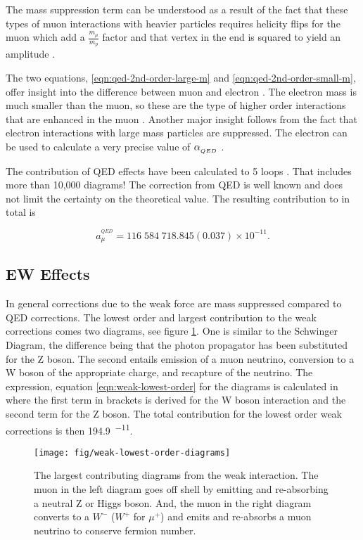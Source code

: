 \noindent
The mass suppression term can be understood as a result of the fact that these types of muon interactions with heavier particles requires helicity flips for the muon which add a $\frac{m_\mu}{m_p}$ factor and that vertex in the end is squared to yield an amplitude \cite{amm-of-muon}.

The two equations, \ref{eqn:qed-2nd-order-large-m} and \ref{eqn:qed-2nd-order-small-m}, offer insight into the difference between muon and electron \gmtwo.  The electron mass is much smaller than the muon, so these are the type of higher order interactions that are enhanced in the muon \gmtwo.  Another major insight follows from the fact that electron interactions with large mass particles are suppressed.  The electron \gmtwo can be used to calculate a very precise value of $\alpha_{_{QED}}$ \cite{g-e-measurement}.

The contribution of QED effects have been calculated to 5 loops \cite{5-loop-qed}.  That includes more than 10,000 diagrams!  The correction from QED is well known and does not limit the certainty on the theoretical value.  The resulting contribution to \mugmtwo in total is

\begin{equation}
\label{eqn:qed-total}
a_\mu^{^{QED}} = 116\;584\;718.845(0.037) \times 10^{-11}.
\end{equation}

\subsection{EW Effects} \label{s-sec:theory-ew}

In general corrections due to the weak force are mass suppressed compared to QED corrections.  The lowest order and largest contribution to the weak corrections comes two diagrams, see figure \ref{fig:weak-lowest-order-diagrams}. One is similar to the Schwinger Diagram, the difference being that the photon propagator has been substituted for the Z boson.  The second entails emission of a muon neutrino, conversion to a W boson of the appropriate charge, and recapture of the neutrino.  The expression, equation \ref{eqn:weak-lowest-order} for the diagrams is calculated in \cite{the-muon-g-2} where the first term in brackets is derived for the W boson interaction and the second term for the Z boson.  The total contribution for the lowest order weak corrections is then \SI{194.9}{^{-11}}.

\begin{figure}
\centering
\texttt{[image: fig/weak-lowest-order-diagrams]}
\caption{The largest contributing diagrams from the weak interaction.  The muon in the left diagram goes off shell by emitting and re-absorbing a neutral Z or Higgs boson.  And, the muon in the right diagram converts to a $W^{-}$ ($W^{+}$ for $\mu^{+}$) and emits and re-absorbs a muon neutrino to conserve fermion number. \label{fig:weak-lowest-order-diagrams}}
\end{figure}


